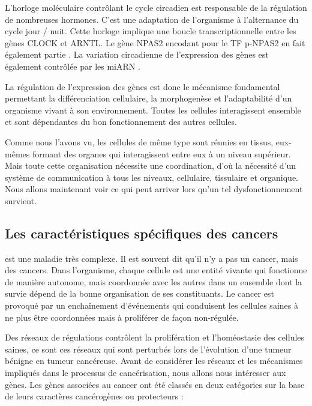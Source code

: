       L'horloge moléculaire contrôlant le cycle circadien est responsable de la régulation de nombreuses hormones.
      C'est une adaptation de l'organisme à l'alternance du cycle jour / nuit.
      Cette horloge implique une boucle transcriptionnelle entre les gènes \acs{CLOCK} et \acs{ARNTL}.
      Le gène \acs{NPAS2} encodant pour le \acs{TF} \acs{p-NPAS2} en fait également partie \citep{Koike2012}.
      La variation circadienne de l'expression des gènes est également contrôlée par les \ac{miARN} \citep{Mehta2012}.

      La régulation de l'expression des gènes est donc le mécanisme fondamental permettant la différenciation cellulaire, la morphogenèse et l'adaptabilité d'un organisme vivant à son environnement.
      Toutes les cellules interagissent ensemble et sont dépendantes du bon fonctionnement des autres cellules.

      Comme nous l'avons vu, les cellules de même type sont réunies en tissus, eux-mêmes formant des organes qui interagissent entre eux à un niveau supérieur.
      Mais toute cette organisation nécessite une coordination, d'où la nécessité d'un système de communication à tous les niveaux, cellulaire, tissulaire et organique.
      Nous allons maintenant voir ce qui peut arriver lors qu'un tel dysfonctionnement survient.

    \subsection{\textcolor{myred}{Les caractéristiques spécifiques des cancers}}

       est une maladie très complexe.
      Il est souvent dit qu'il n'y a pas un cancer, mais des cancers.
      Dans l'organisme, chaque cellule est une entité vivante qui fonctionne de manière autonome, mais coordonnée avec les autres dans un ensemble dont la survie dépend de la bonne organisation de ses constituants.
      Le cancer est provoqué par un enchaînement d'événements qui conduisent les cellules saines à ne plus être coordonnées mais à proliférer de façon non-régulée.

      Des réseaux de régulations contrôlent la prolifération et l'homéostasie des cellules saines, ce sont ces réseaux qui sont perturbés lors de l'évolution d'une tumeur bénigne en tumeur cancéreuse.
      Avant de considérer les réseaux et les mécanismes impliqués dans le processus de cancérisation, nous allons nous intéresser aux gènes.
      Les gènes associées au cancer ont été classés en deux catégories sur la base de leurs caractères cancérogènes ou protecteurs :

